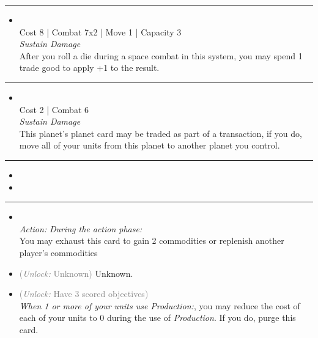 \begin{multicols}{2}
\vspace{-10pt}\rule{\hsize}{0.4pt}\vspace{5pt}


\begin{itemize}
\item {}\\
Cost 8 | Combat 7x2 | Move 1 | Capacity 3 \\
\emph{Sustain Damage}\\
After you roll a die during a space combat in this system, you may spend 1 trade good to apply +1 to the result.
\end{itemize}

\vspace{-10pt}\rule{\hsize}{0.4pt}\vspace{5pt}


\begin{itemize}
\item {}
\\
Cost 2 | Combat 6 \\
\emph{Sustain Damage}\\
This planet’s planet card may be traded as part of a transaction, if you do, move all of your units from this planet to another planet you control.
\end{itemize}

\vspace{-10pt}\rule{\hsize}{0.4pt}\vspace{5pt}

\nounits

\columnbreak
{}

\begin{itemize}
\item \biomes
\item \datahub
\end{itemize}

\vspace{-10pt}\rule{\hsize}{0.4pt}\vspace{5pt}


\begin{itemize}
\item {}\\
\emph{Action:}
\emph{During the action phase:}\\
You may exhaust this card to gain 2 commodities or replenish another player's commodities
\item {} \textcolor{gray}{(\emph{Unlock:} Unknown)}
Unknown.
\item {} \textcolor{gray}{(\emph{Unlock:} Have 3 scored objectives)}\\
\emph{When 1 or more of your units use \emph{Production}:}, you may reduce the cost of each of your units to 0 during the use of \emph{Production}. If you do, purge this card. 
\end{itemize}


\end{multicols}

